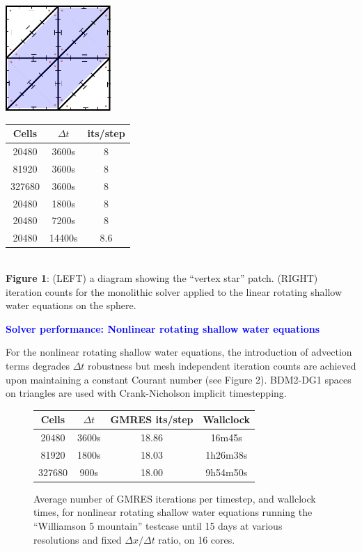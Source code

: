 \documentclass[a4paper,10pt]{article}
\begin{document}
  \vspace{-5mm}
  \begin{center}
  \parbox{6.2cm}{
    \vspace{1cm}
  \includegraphics[width=4cm]{Images/patch}}
  \begin{tabular}{ccc}
    Cells & $\Delta t$ & its/step \\
    \hline
    20480 & 3600s & 8 \\
    81920 & 3600s & 8 \\
    327680 & 3600s & 8 \\
    20480 & 1800s & 8 \\
    20480 & 7200s & 8 \\
    20480 & 14400s & 8.6 \\
  \end{tabular} \\
  \vspace{2mm}
  {\bfseries Figure 1}: (LEFT) a diagram showing the ``vertex star'' patch. (RIGHT)
  iteration counts for the monolithic solver applied to the linear
  rotating shallow water equations on the sphere.
  \end{center}



 \noindent \textcolor{blue}{\textbf{Solver performance: Nonlinear rotating shallow water equations}}

 For the nonlinear rotating shallow water equations, the introduction
 of advection terms degrades $\Delta t$ robustness but mesh independent
 iteration counts are achieved upon maintaining a constant Courant
 number (see Figure 2). BDM2-DG1 spaces on triangles are used
 with Crank-Nicholson implicit timestepping.

\begin{figure}[h]
 \begin{tabular}{cccc}
    Cells & $\Delta t$ & GMRES its/step & Wallclock \\
    \hline
    20480 & 3600s & 18.86 & 16m45s \\
    81920 & 1800s & 18.03 & 1h26m38s \\
    327680 & 900s & 18.00 & 9h54m50s \\
  \end{tabular}
   \caption{Average number of GMRES
      iterations per timestep, and wallclock times, for nonlinear
      rotating shallow water equations running the ``Williamson 5
      mountain'' testcase until 15 days at various resolutions and
      fixed $\Delta x/\Delta t$ ratio, on 16 cores.}
\end{figure}
\end{document}
